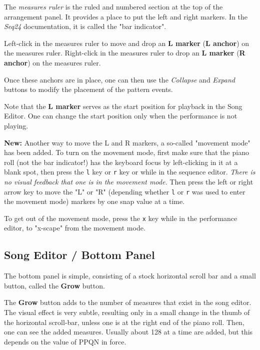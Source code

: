    The \textsl{measures ruler} is the ruled and numbered section at the top
   of the arrangement panel.  It provides a place to put the left and right
   markers.  In the \textsl{Seq24} documentation, it is called the "bar
   indicator".

   Left-click in the measures ruler to move and drop an
   \textbf{L marker} (\textbf{L anchor}) on the measures ruler.
   Right-click in the measures ruler to drop an
   \textbf{L marker} (\textbf{R anchor}) on the measures ruler.

   Once these anchors are in place, one can then use
	the \textsl{Collapse} and \textsl{Expand} buttons to modify the
   placement of the pattern events.

   Note that the \textbf{L marker} serves as the start position for playback
   in the Song Editor.  One can change the start position only when the
   performance is not playing.

   \textbf{New:}
   Another way to move the L and R markers, a so-called "movement mode"
   has been added.
   To turn on the movement mode, first make sure that the piano roll (not the
   bar indicator!) has the
   keyboard focus by left-clicking in it at a blank spot, then press the
   \texttt{l} key or
   \texttt{r} key or
   while in the sequence editor.
   \textsl{There is no visual feedback that one is in the movement mode.}
   Then press the left or right arrow key to move the "L" or "R" (depending
   whether \texttt{l} or \texttt{r} was used to enter the movement mode)
   markers by one snap value at a time.

   To get out of the movement mode, press the
   \texttt{x} key while in the performance editor, to "x-scape" from the
   movement mode.

\subsection{Song Editor / Bottom Panel}
\label{subsec:seq64_song_editor_bottom}

   The bottom panel is simple, consisting of a stock horizontal scroll bar
   and a small button, called the \textbf{Grow} button.

   The \textbf{Grow} button adds to the number of measures that exist
   in the song editor. The visual effect is very subtle, resulting only
   in a small change in the thumb of the horizontal scroll-bar, unless one
   is at the right end of the piano roll.  Then, one can see the added
   measures.  Usually about 128 at a time are added, but this depends on the
   value of PPQN in force.

